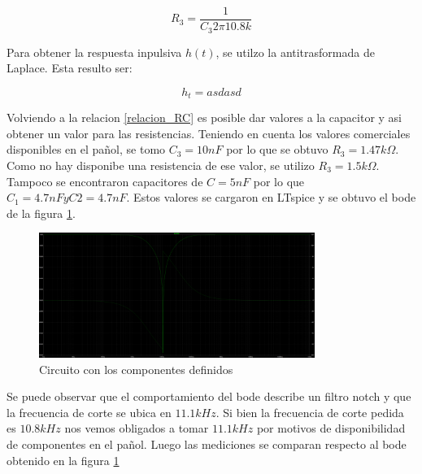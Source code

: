 \documentclass[12pt,a4paper]{article}
\begin{document}
\begin{equation} R_{3} = \frac{1}{C_{3} 2\pi 10.8k} \label{relacion_RC}\end{equation}

Para obtener la respuesta inpulsiva $h(t)$, se utilzo la antitrasformada de Laplace. Esta resulto ser: 

\begin{equation} h_{t} = asdasd  \end{equation}









Volviendo a la relacion \ref{relacion_RC} es posible dar valores a la capacitor y asi obtener un valor para las resistencias. Teniendo en cuenta
los valores comerciales disponibles en el pañol, se tomo $C_{3} = 10nF$ por lo que se obtuvo $R_{3}=1.47k\Omega$. Como
no hay disponibe una resistencia de ese valor, se utilizo $R_{3}=1.5k\Omega$. Tampoco se encontraron capacitores de $C = 5nF$ 
por lo que $C_{1} = 4.7nF y  C{2} = 4.7nF$. Estos valores se cargaron en LTspice y se obtuvo el bode de la 
figura \ref{fig:bode_ltspice_teorico}.

\begin{figure}[ht]                                                       
    \centering\includegraphics[width=0.8\textwidth]{bode_ltspice_teorico.png}
    \caption{Circuito con los componentes definidos}
    \label{fig:bode_ltspice_teorico}
    \end{figure}

Se puede observar que el comportamiento del bode describe un filtro notch y que la frecuencia de corte se ubica en $11.1kHz$. Si
bien la frecuencia de corte pedida es $10.8kHz$ nos vemos obligados a tomar $11.1kHz$ por motivos de disponibilidad de componentes
en el pañol. Luego las mediciones se comparan respecto al bode obtenido en la figura \ref{fig:bode_ltspice_teorico}
\end{document}
